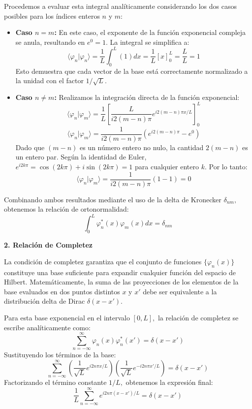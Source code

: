 \documentclass[a4paper]{article}
\begin{document}
Procedemos a evaluar esta integral analíticamente considerando los dos casos posibles para los índices enteros $n$ y $m$:

\begin{itemize}
    \item \textbf{Caso $n = m$:}
    En este caso, el exponente de la función exponencial compleja se anula, resultando en $e^0 = 1.$ La integral se simplifica a:
    $$ \langle \varphi_n | \varphi_n \rangle = \frac{1}{L} \int_{0}^{L} (1) dx = \frac{1}{L} [x]_{0}^{L} = \frac{L}{L} = 1 $$
    Esto demuestra que cada vector de la base está correctamente normalizado a la unidad con el factor $1/\sqrt{L}.$

    \item \textbf{Caso $n \neq m$:}
    Realizamos la integración directa de la función exponencial:
    $$ \langle \varphi_n | \varphi_m \rangle = \frac{1}{L} \left[ \frac{L}{i2(m-n)\pi} e^{i2(m-n)\pi x / L} \right]_{0}^{L} $$
    $$ \langle \varphi_n | \varphi_m \rangle = \frac{1}{i2(m-n)\pi} \left( e^{i2(m-n)\pi} - e^0 \right) $$
    Dado que $(m-n)$ es un número entero no nulo, la cantidad $2(m-n)$ es un entero par. Según la identidad de Euler, $e^{i2k\pi} = \cos(2k\pi) + i\sin(2k\pi) = 1$ para cualquier entero $k.$ Por lo tanto:
    $$ \langle \varphi_n | \varphi_m \rangle = \frac{1}{i2(m-n)\pi} (1 - 1) = 0 $$
\end{itemize}

Combinando ambos resultados mediante el uso de la delta de Kronecker $\delta_{nm},$ obtenemos la relación de ortonormalidad:
$$ \int_{0}^{L} \varphi_n^*(x) \varphi_m(x) dx = \delta_{nm} $$

\textbf{2. Relación de Completez}

La condición de completez garantiza que el conjunto de funciones $\{\varphi_n(x)\}$ constituye una base suficiente para expandir cualquier función del espacio de Hilbert. Matemáticamente, la suma de las proyecciones de los elementos de la base evaluados en dos puntos distintos $x$ y $x'$ debe ser equivalente a la distribución delta de Dirac $\delta(x - x').$

Para esta base exponencial en el intervalo $[0, L],$ la relación de completez se escribe analíticamente como:
$$ \sum_{n=-\infty}^{\infty} \varphi_n(x) \varphi_n^*(x') = \delta(x - x') $$
Sustituyendo los términos de la base:
$$ \sum_{n=-\infty}^{\infty} \left( \frac{1}{\sqrt{L}} e^{i2n\pi x / L} \right) \left( \frac{1}{\sqrt{L}} e^{-i2n\pi x' / L} \right) = \delta(x - x') $$
Factorizando el término constante $1/L,$ obtenemos la expresión final:
$$ \frac{1}{L} \sum_{n=-\infty}^{\infty} e^{i2n\pi(x - x')/L} = \delta(x - x') $$
\end{document}
